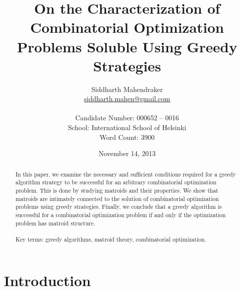 \documentclass[a4paper,11pt]{report}
\theoremstyle{plain}
\theoremstyle{definition}
\begin{document}
\title{On the Characterization of Combinatorial Optimization Problems Soluble Using Greedy Strategies}
\author{Siddharth Mahendraker\\
    \url{siddharth.mahen@gmail.com}\\\\
    Candidate Number: 000652 -- 0016\\
    School: International School of Helsinki\\
    Word Count: 3900}

\date{November 14, 2013}

\maketitle

\begin{abstract}
In this paper, we examine the necessary and sufficient conditions required for
a greedy algorithm strategy to be successful for an arbitrary combinatorial
optimization problem. This is done by studying matroids and their properties.
We show that matroids are intimately connected to the solution of combinatorial
optimization problems using greedy strategies. Finally, we conclude that a
greedy algorithm is successful for a combinatorial optimization problem if and
only if the optimization problem has matroid structure.\\\\
Key terms: greedy algorithms, matroid theory, combinatorial optimization.
\end{abstract}

\setcounter{secnumdepth}{3}
\renewcommand{\thesection}{\arabic{section}}

\renewcommand{\cfttoctitlefont}{\Large\bfseries}
\setlength\cftaftertoctitleskip{1em}
\setlength\cftbeforesecskip{0.5em}

\setcounter{page}{1}
\tableofcontents
\clearpage
\setcounter{page}{1}

\section{Introduction}
\end{document}
